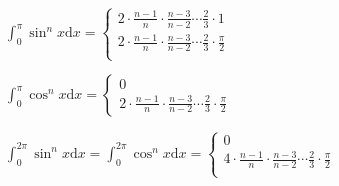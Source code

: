 \begin{spacing}{\hangju}
    \noindent $\int_{0}^{\pi}{\sin^n{x}}\mathrm{d}x = \left\{ \begin{array}{l}
        2 \cdot \frac{n - 1}{n} \cdot \frac{n - 3}{n - 2} \cdots \frac{2}{3} \cdot 1 \\
        2 \cdot \frac{n - 1}{n} \cdot \frac{n - 3}{n - 2} \cdots \frac{2}{3} \cdot \frac{\pi}{2} \\
    \end{array}\right.$

    \noindent $\int_{0}^{\pi}{\cos^n{x}}\mathrm{d}x = \left\{ \begin{array}{l}
        0 \\
        2 \cdot \frac{n - 1}{n} \cdot \frac{n - 3}{n - 2} \cdots \frac{2}{3} \cdot \frac{\pi}{2}
    \end{array}\right.$

    \noindent $\int_{0}^{2\pi}{\sin^n{x}}\mathrm{d}x = \int_{0}^{2\pi}{\cos^n{x}}\mathrm{d}x =
        \left\{ \begin{array}{l}
        0 \\
        4 \cdot \frac{n - 1}{n} \cdot \frac{n - 3}{n - 2} \cdots \frac{2}{3} \cdot \frac{\pi}{2} \\
    \end{array}\right. $
\end{spacing}
